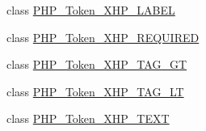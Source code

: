 \begin{DoxyCompactItemize}
\item 
class \mbox{\hyperlink{class_p_h_p___token___x_h_p___l_a_b_e_l}{P\+H\+P\+\_\+\+Token\+\_\+\+X\+H\+P\+\_\+\+L\+A\+B\+EL}}
\item 
class \mbox{\hyperlink{class_p_h_p___token___x_h_p___r_e_q_u_i_r_e_d}{P\+H\+P\+\_\+\+Token\+\_\+\+X\+H\+P\+\_\+\+R\+E\+Q\+U\+I\+R\+ED}}
\item 
class \mbox{\hyperlink{class_p_h_p___token___x_h_p___t_a_g___g_t}{P\+H\+P\+\_\+\+Token\+\_\+\+X\+H\+P\+\_\+\+T\+A\+G\+\_\+\+GT}}
\item 
class \mbox{\hyperlink{class_p_h_p___token___x_h_p___t_a_g___l_t}{P\+H\+P\+\_\+\+Token\+\_\+\+X\+H\+P\+\_\+\+T\+A\+G\+\_\+\+LT}}
\item 
class \mbox{\hyperlink{class_p_h_p___token___x_h_p___t_e_x_t}{P\+H\+P\+\_\+\+Token\+\_\+\+X\+H\+P\+\_\+\+T\+E\+XT}}
\end{DoxyCompactItemize}
